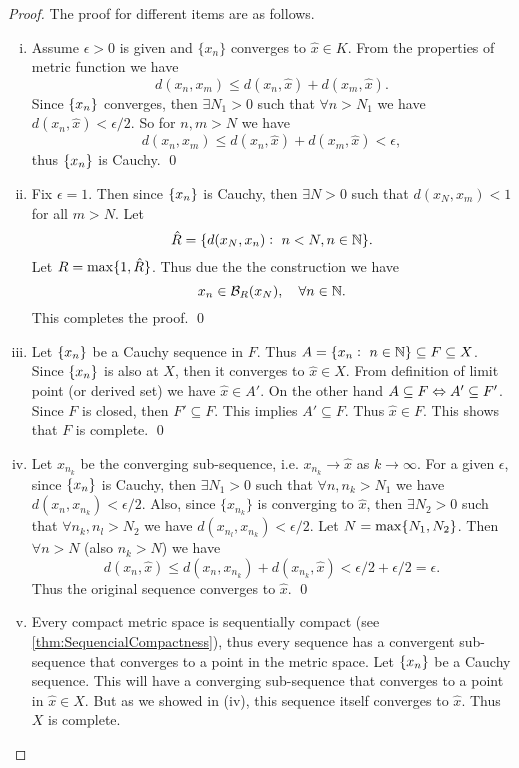 \begin{proof}
	The proof for different items are as follows.
	\begin{enumerate}[(i)]
		\item Assume $\epsilon>0$ is given and $\{x_n\}$ converges to $\hat{x} \in K$. From the properties of metric function we have
		\[ d(x_n, x_m) \leq d(x_n,\hat{x}) + d(x_m,\hat{x}). \]
		Since $\{x_n\}$ converges, then $\exists N_1 > 0$ such that $\forall n > N_1$ we have $d(x_n,\hat{x}) < \epsilon/2$. So for $n,m > N$ we have
		\[  d(x_n, x_m) \leq d(x_n,\hat{x}) + d(x_m,\hat{x}) < \epsilon,\]
		thus $\{x_n\}$ is Cauchy. \qed
		
		\item Fix $\epsilon=1$. Then since $\{x_n\}$ is Cauchy, then $\exists N > 0$ such that $d(x_N, x_m) < 1 $ for all $m > N$. Let
		\[ \hat{R} = \{ d(x_N, x_n):\ n < N, n \in \mathbb{N} \}. \]
		Let $ R = \max\{1,\hat{R}\}$. Thus due the the construction we have
		\[ x_n \in \mathcal{B}_{R}(x_N), \quad \forall n \in \mathbb{N}. \]
		This completes the proof. \qed
		
		\item Let $\{x_n\}$ be a Cauchy sequence in $F$. Thus $A = \{x_n:\ n\in\mathbb{N} \} \subseteq F \subseteq X$. Since $\{x_n\}$ is also at $X$, then it converges to $\hat{x}\in X$. From definition of limit point (or derived set) we have $\hat{x} \in A'$. On the other hand $A \subseteq F \Leftrightarrow A' \subseteq F'$. Since $F$ is closed, then $F' \subseteq F$. This implies $A' \subseteq F$. Thus $\hat{x} \in F$. This shows that $F$ is complete.    \qed
		
		\item Let $x_{n_k}$ be the converging sub-sequence, i.e. $x_{n_k} \to \hat{x}$ as $k \to \infty$. For a given $\epsilon$, since $\{x_n\}$ is Cauchy, then $\exists N_1 > 0$ such that $\forall n,n_k > N_1$ we have $d(x_n, x_{n_k})<\epsilon/2$. Also, since $\{x_{n_k}\}$ is converging to $\hat{x}$, then $\exists N_2 > 0$ such that $\forall n_k, n_l > N_2$ we have $d(x_{n_l}, x_{n_k}) < \epsilon/2$. Let $N = \max\{N_1,N_2\}$. Then $\forall n > N$ (also $n_k > N$) we have
		\[ d(x_n, \hat{x}) \leq d(x_n, x_{n_k}) + d(x_{n_k},\hat{x}) < \epsilon/2 + \epsilon/2 = \epsilon.\]
 		Thus the original sequence converges to $\hat{x}$. \qed
 		
 		\item Every compact metric space is sequentially compact (see \autoref{thm:SequencialCompactness}), thus every sequence has a convergent sub-sequence that converges to a point in the metric space. Let $\{x_n\}$ be a Cauchy sequence. This will have a converging sub-sequence that converges to a point in $\hat{x} \in X$. But as we showed in (iv), this sequence itself converges to $\hat{x}$. Thus $X$ is complete.
	\end{enumerate}
\end{proof}

